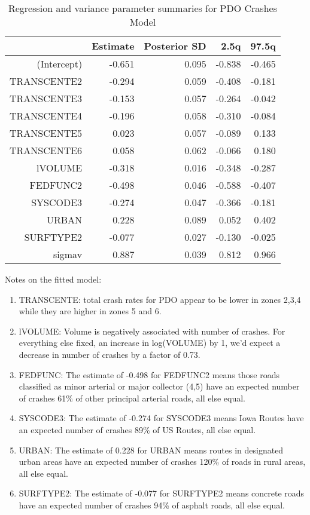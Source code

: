 \documentclass[a4paper]{article}\usepackage[]{graphicx}\usepackage[]{color}
\begin{document}
\begin{table}[h]
\centering
\begin{tabular}{rrrrr}
  \hline
 & Estimate & Posterior SD & 2.5q & 97.5q \\ 
  \hline
(Intercept) & -0.651 & 0.095 & -0.838 & -0.465 \\ 
  TRANSCENTE2 & -0.294 & 0.059 & -0.408 & -0.181 \\ 
  TRANSCENTE3 & -0.153 & 0.057 & -0.264 & -0.042 \\ 
  TRANSCENTE4 & -0.196 & 0.058 & -0.310 & -0.084 \\ 
  TRANSCENTE5 & 0.023 & 0.057 & -0.089 & 0.133 \\ 
  TRANSCENTE6 & 0.058 & 0.062 & -0.066 & 0.180 \\ 
  lVOLUME & -0.318 & 0.016 & -0.348 & -0.287 \\ 
  FEDFUNC2 & -0.498 & 0.046 & -0.588 & -0.407 \\ 
  SYSCODE3 & -0.274 & 0.047 & -0.366 & -0.181 \\ 
  URBAN & 0.228 & 0.089 & 0.052 & 0.402 \\ 
  SURFTYPE2 & -0.077 & 0.027 & -0.130 & -0.025 \\ 
  sigmav & 0.887 & 0.039 & 0.812 & 0.966 \\ 
   \hline
\end{tabular}
\caption{Regression and variance parameter summaries for PDO Crashes Model} 
\label{pdocrash}
\end{table}


Notes on the fitted model:

\begin{enumerate}
\item
TRANSCENTE: total crash rates for PDO appear to be lower in zones 2,3,4 while they are higher in zones 5 and 6. 

\item
lVOLUME: Volume is negatively associated with number of crashes. For everything else fixed, an increase in log(VOLUME) by 1, we'd expect a decrease in number of crashes by a factor of 0.73.

\item
FEDFUNC: The estimate of -0.498 for FEDFUNC2 means those roads classified as minor arterial or major collector (4,5) have an expected number of crashes 61\% of other principal arterial roads, all else equal. 

\item
SYSCODE3: The estimate of -0.274 for SYSCODE3 means Iowa Routes have an expected number of crashes 89\% of US Routes, all else equal.

\item
URBAN: The estimate of 0.228 for URBAN means routes in designated urban areas have an expected number of crashes 120\% of roads in rural areas, all else equal.

\item
SURFTYPE2: The estimate of -0.077 for SURFTYPE2 means concrete roads have an expected number of crashes 94\% of asphalt roads, all else equal.

\end{enumerate}
\end{document}
